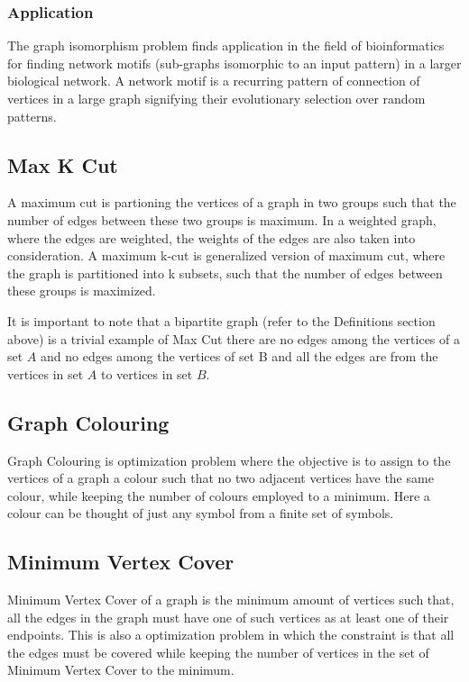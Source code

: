 \subsubsection{Application}
The graph isomorphism problem finds application in the field of bioinformatics
for finding network motifs (sub-graphs isomorphic to an input pattern) in a
larger biological network. A network motif is a recurring pattern of connection
of vertices in a large graph signifying their evolutionary selection over
random patterns. \cite{Bonnici2013}

\subsection{Max K Cut}
A maximum cut is partioning the vertices of a graph in two groups such that
the number of edges between these two groups is maximum. In a weighted graph,
where the edges are weighted, the weights of the edges are also taken into
consideration.  A maximum k-cut is generalized version of maximum cut, where
the graph is partitioned into k subsets, such that the number of edges between
these groups is maximized.

It is important to note that a bipartite graph (refer to the Definitions
section above) is a trivial example of Max Cut there are no edges among the
vertices of a set $A$ and no edges among the vertices of set B and all the edges
are from the vertices in set $A$ to vertices in set $B$.

\subsection{Graph Colouring}
Graph Colouring is optimization problem where the objective is to assign to the vertices
of a graph a colour such that no two adjacent vertices have the same colour,
while keeping the number of colours employed to a minimum. Here a colour can be
thought of just any symbol from a finite set of symbols.

\subsection{Minimum Vertex Cover}
Minimum Vertex Cover of a graph is the minimum amount of vertices such that,
all the edges in the graph must have one of such vertices as at least one of
their endpoints. This is also a optimization problem in which the constraint is
that all the edges must be covered while keeping the number of vertices in the
set of Minimum Vertex Cover to the minimum.


